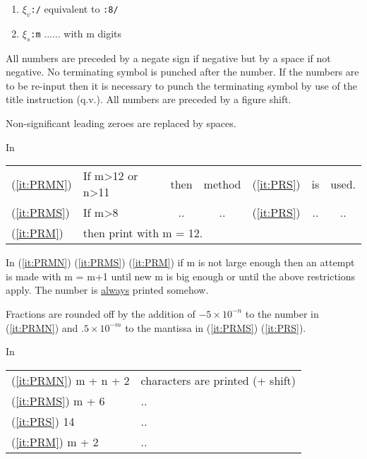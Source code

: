 \documentclass[10pt, a4paper, oneside]{article}
\newcommand{\myuline}[1]{\uline{#1}}
\newcommand{\mytt}[1]{\texttt{\scriptsize #1}}
\newcommand{\mytt}[1]{\texttt{\small #1}}
\begin{document}
\begin{multicols}{2}
\begin{enumerate}
\item\label{it:PRS} $\xi_{v}$\mytt{:/} equivalent to \mytt{:8/}

\item\label{it:PRM} $\xi_{s}$\mytt{:m} ...... with m digits

\end{enumerate}

All numbers are preceded by a negate sign if
negative but by a space if not negative.  No terminating
symbol is punched after the number.  If the numbers
are to be re-input then it is necessary to punch the
terminating symbol by use of the title instruction
(q.v.).  All numbers are preceded by a figure shift.

Non-significant leading zeroes are replaced by
spaces.

\begin{flushleft}
In
\end{flushleft}

\begin{tabular}{llcclcc}
(\ref{it:PRMN}) & If m>12 or n>11 & then & method & (\ref{it:PRS}) & is & used. \\
(\ref{it:PRMS}) & If m>8 & .. & .. & (\ref{it:PRS}) & .. & .. \\
(\ref{it:PRM})  & \multicolumn{6}{l}{then print with m = 12.} \\
\end{tabular}

In (\ref{it:PRMN}) (\ref{it:PRMS}) (\ref{it:PRM})
if m is not large enough then an attempt is made
with m = m+1 until new m is big
enough or until the above restrictions apply.  The
number is \myuline{always} printed somehow.

Fractions are rounded off by the addition of
$-5 \times 10^{-n}$ to the number in (\ref{it:PRMN}) and $.5 \times 10^{-m}$ to the
mantissa in (\ref{it:PRMS}) (\ref{it:PRS}).

\begin{flushleft}
In
\end{flushleft}

\begin{tabular}{ll}
(\ref{it:PRMN}) m + n + 2 & characters are printed (+ shift) \\
(\ref{it:PRMS}) m + 6     & \hspace{3em} .. \\
(\ref{it:PRS}) 14         & \hspace{3em} .. \\
(\ref{it:PRM}) m + 2      & \hspace{3em} .. \\
\end{tabular}


\end{multicols}
\end{document}
